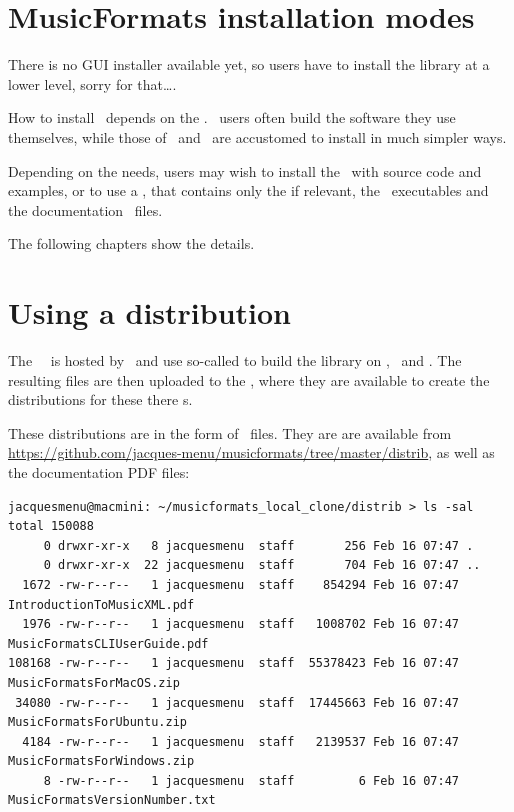 
\chapter{MusicFormats installation modes}

There is no GUI installer available yet, so users have to install the library at a lower level, sorry for that\dots.

How to install \mf\ depends on the \OS. \Linux\ users often build the software they use themselves, while those of \Windows\ and \MacOS\ are accustomed to install in much simpler ways.

Depending on the needs, users may wish to install the  \mf\ with source code and examples, or to use a , that contains only the  if relevant, the \CLI\ executables and the documentation \pdf\ files.

The following chapters show the details.


\chapter{Using a distribution}

The \mf\ \repo\ is hosted by \github\ and use so-called  to build the library on \MacOS, \Ubuntu\ and \Windows. The resulting files are then uploaded to the \repo, where they are available to create the distributions for these there \OS s.

These distributions are in the form of \zip\ files. They are are available from \url{https://github.com/jacques-menu/musicformats/tree/master/distrib}, as well as the documentation PDF files:
\begin{lstlisting}[language=Terminal]
jacquesmenu@macmini: ~/musicformats_local_clone/distrib > ls -sal
total 150088
     0 drwxr-xr-x   8 jacquesmenu  staff       256 Feb 16 07:47 .
     0 drwxr-xr-x  22 jacquesmenu  staff       704 Feb 16 07:47 ..
  1672 -rw-r--r--   1 jacquesmenu  staff    854294 Feb 16 07:47 IntroductionToMusicXML.pdf
  1976 -rw-r--r--   1 jacquesmenu  staff   1008702 Feb 16 07:47 MusicFormatsCLIUserGuide.pdf
108168 -rw-r--r--   1 jacquesmenu  staff  55378423 Feb 16 07:47 MusicFormatsForMacOS.zip
 34080 -rw-r--r--   1 jacquesmenu  staff  17445663 Feb 16 07:47 MusicFormatsForUbuntu.zip
  4184 -rw-r--r--   1 jacquesmenu  staff   2139537 Feb 16 07:47 MusicFormatsForWindows.zip
     8 -rw-r--r--   1 jacquesmenu  staff         6 Feb 16 07:47 MusicFormatsVersionNumber.txt
\end{lstlisting}

